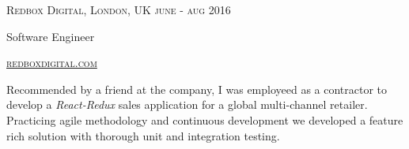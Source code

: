 {
  \textsc{\small{Redbox Digital, London, UK
    \hfill
      {\raggedleft
        june - aug 2016
      } \\
    }
  }
  {\raggedright\large {
      Software Engineer
  }}

  \textsc{\small\href{http://www.redboxdigital.com}{redboxdigital.com}}

  \normalsize{\raggedright
    Recommended by a friend at the company, I was employeed as a contractor to develop a \emph{React-Redux} sales application for a global multi-channel retailer. Practicing agile methodology and continuous development we developed a feature rich solution with thorough unit and integration testing. 
  }
}
